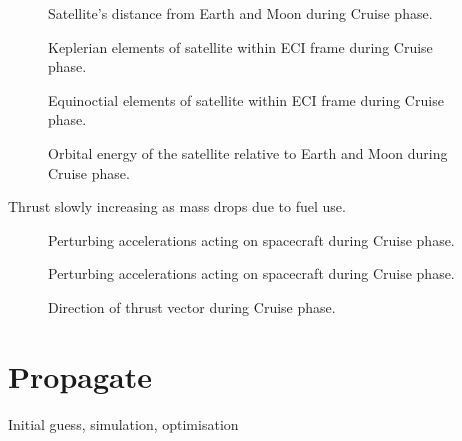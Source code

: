 \begin{figure}
\centering
\def\svgwidth{\figurewidth}
%
\caption{Satellite's distance from Earth and Moon during Cruise phase.}
\label{fig:Cruise-dist}
\end{figure}

\begin{figure}
\centering
\def\svgwidth{\figurewidth}

\caption{Keplerian elements of satellite within ECI frame during Cruise phase.}
\label{fig:Cruise-kep}
\end{figure}

\begin{figure}
\centering
\def\svgwidth{\figurewidth}

\caption{Equinoctial elements of satellite within ECI frame during Cruise phase.}
\label{fig:Cruise-mee}
\end{figure}

\begin{figure}
\centering
\def\svgwidth{\figurewidth}
%
\caption{Orbital energy of the satellite relative to Earth and Moon during Cruise phase.}
\label{fig:Cruise-orbeng}
\end{figure}

Thrust slowly increasing as mass drops due to fuel use.

\begin{figure}
\centering
\def\svgwidth{\figurewidth}

\caption{Perturbing accelerations acting on spacecraft during Cruise phase.}
\label{fig:Cruise-pert}
\end{figure}

\begin{figure}
\centering
\def\svgwidth{\figurewidth}

\caption{Perturbing accelerations acting on spacecraft during Cruise phase.}
\label{fig:Cruise-pert2}
\end{figure}

\begin{figure}
\centering
\def\svgwidth{\figurewidth}

\caption{Direction of thrust vector during Cruise phase.}
\label{fig:Cruise-thrust}
\end{figure}


\clearpage 

\section{Propagate}
Initial guess, simulation, optimisation

